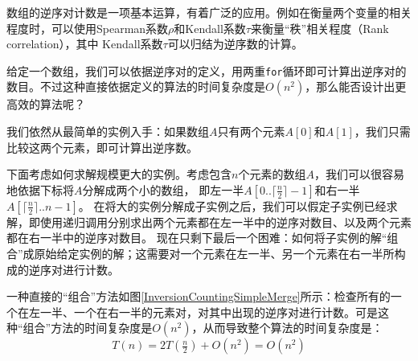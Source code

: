  数组的逆序对计数是一项基本运算，有着广泛的应用。例如在衡量两个变量的相关程度时，可以使用Spearman系数$\rho$和Kendall系数$\tau$来衡量“秩”相关程度（Rank correlation），其中 Kendall系数$\tau$可以归结为逆序数的计算\cite{Kendall1938}。

给定一个数组，我们可以依据逆序对的定义，用两重{\tt for}循环即可计算出逆序对的数目。不过这种直接依据定义的算法的时间复杂度是$O(n^2)$，那么能否设计出更高效的算法呢？

我们依然从最简单的实例入手：如果数组$A$只有两个元素$A[0]$和$A[1]$，我们只需比较这两个元素，即可计算出逆序数。

下面考虑如何求解规模更大的实例。考虑包含$n$个元素的数组$A$，我们可以很容易地依据下标将$A$分解成两个小的数组，
即左一半$A[0..\lceil\frac{n}{2}\rceil-1]$和右一半$A[\lceil\frac{n}{2}\rceil..n-1]$。
在将大的实例分解成子实例之后，我们可以假定子实例已经求解，即使用递归调用分别求出两个元素都在左一半中的逆序对数目、以及两个元素都在右一半中的逆序对数目。
现在只剩下最后一个困难：如何将子实例的解“组合”成原始给定实例的解；这需要对一个元素在左一半、另一个元素在右一半所构成的逆序对进行计数。

一种直接的“组合”方法如图\ref{InversionCountingSimpleMerge}所示：检查所有的一个在左一半、一个在右一半的元素对，对其中出现的逆序对进行计数。可是这种“组合”方法的时间复杂度是$O(n^2)$，从而导致整个算法的时间复杂度是：
\[
	T(n) = 2T(\tfrac{n}{2}) + O(n^2) = O(n^2) 
\]


%

